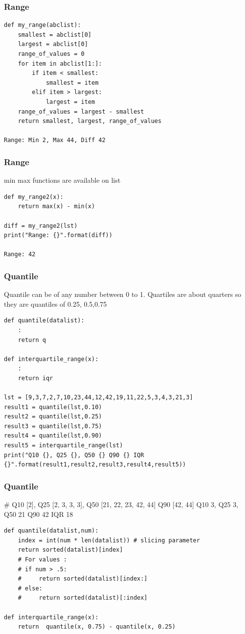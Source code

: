 \begin{frame}[fragile]\frametitle{Range}
\begin{lstlisting}
def my_range(abclist):
    smallest = abclist[0]
    largest = abclist[0]
    range_of_values = 0
    for item in abclist[1:]:
        if item < smallest:
            smallest = item
        elif item > largest:
            largest = item
    range_of_values = largest - smallest
    return smallest, largest, range_of_values

Range: Min 2, Max 44, Diff 42
\end{lstlisting}
\end{frame}

\begin{frame}[fragile]\frametitle{Range}
min max functions are available on list
\begin{lstlisting}
def my_range2(x):
	return max(x) - min(x)

diff = my_range2(lst)
print("Range: {}".format(diff))	

Range: 42
\end{lstlisting}
\end{frame}

\begin{frame}[fragile]\frametitle{Quantile}
Quantile can be of any number between 0 to 1. Quartiles are about quarters so they are quantiles of 0.25, 0.5,0.75

\begin{lstlisting}
def quantile(datalist):
	:
	return q

def interquartile_range(x):
	:
	return iqr
	
lst = [9,3,7,2,7,10,23,44,12,42,19,11,22,5,3,4,3,21,3]
result1 = quantile(lst,0.10)
result2 = quantile(lst,0.25)
result3 = quantile(lst,0.75)
result4 = quantile(lst,0.90)
result5 = interquartile_range(lst)
print("Q10 {}, Q25 {}, Q50 {} Q90 {} IQR {}".format(result1,result2,result3,result4,result5))
\end{lstlisting}
\end{frame}

\begin{frame}[fragile]\frametitle{Quantile}

\# Q10 [2], Q25 [2, 3, 3, 3], Q50 [21, 22, 23, 42, 44] Q90 [42, 44]
Q10 3, Q25 3, Q50 21 Q90 42 IQR 18

\begin{lstlisting}
def quantile(datalist,num):
    index = int(num * len(datalist)) # slicing parameter
    return sorted(datalist)[index]
    # For values :
    # if num > .5:
    #     return sorted(datalist)[index:]
    # else:
    #     return sorted(datalist)[:index]

def interquartile_range(x):
    return	quantile(x, 0.75) - quantile(x, 0.25)
\end{lstlisting}

\end{frame}


